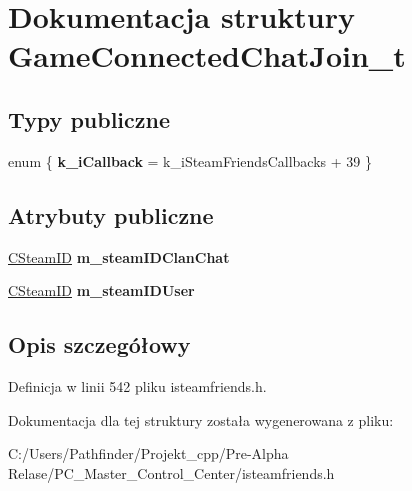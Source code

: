 \hypertarget{struct_game_connected_chat_join__t}{}\section{Dokumentacja struktury Game\+Connected\+Chat\+Join\+\_\+t}
\label{struct_game_connected_chat_join__t}
\subsection*{Typy publiczne}
\begin{DoxyCompactItemize}
\item 
\mbox{\label{struct_game_connected_chat_join__t_a47f54b3c8e7f4fa57d9f2b3333453dea}} 
enum \{ {\bfseries k\+\_\+i\+Callback} = k\+\_\+i\+Steam\+Friends\+Callbacks + 39
 \}
\end{DoxyCompactItemize}
\subsection*{Atrybuty publiczne}
\begin{DoxyCompactItemize}
\item 
\mbox{\label{struct_game_connected_chat_join__t_a14a286f8587b2d9ef08b0e784d1b2e38}} 
\hyperlink{class_c_steam_i_d}{C\+Steam\+ID} {\bfseries m\+\_\+steam\+I\+D\+Clan\+Chat}
\item 
\mbox{\label{struct_game_connected_chat_join__t_add811d90fbe12f189e7281988a595cf8}} 
\hyperlink{class_c_steam_i_d}{C\+Steam\+ID} {\bfseries m\+\_\+steam\+I\+D\+User}
\end{DoxyCompactItemize}


\subsection{Opis szczegółowy}


Definicja w linii 542 pliku isteamfriends.\+h.



Dokumentacja dla tej struktury została wygenerowana z pliku\+:\begin{DoxyCompactItemize}
\item 
C\+:/\+Users/\+Pathfinder/\+Projekt\+\_\+cpp/\+Pre-\/\+Alpha Relase/\+P\+C\+\_\+\+Master\+\_\+\+Control\+\_\+\+Center/isteamfriends.\+h\end{DoxyCompactItemize}
